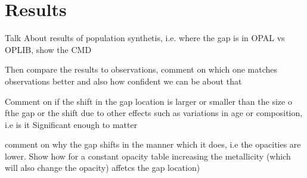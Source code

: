 \section{Results}\label{sec:results}
{\color{red} Talk About results of population synthetis, i.e. where the gap is
in OPAL vs OPLIB, show the CMD}

{\color{red} Then compare the results to observations, comment on which one
matches observations better and also how confident we can be about that}

{\color{red} Comment on if the shift in the gap location is larger or smaller
than the size o fthe gap or the shift due to other effects such as variations
in age or composition, i.e is it Significant enough to matter}

{\color{red} comment on why the gap shifts in the manner which it does, i.e the
opacities are lower. Show how for a constant opacity table increasing the
metallicity (which will also change the opacity) affetcs the gap location)}
